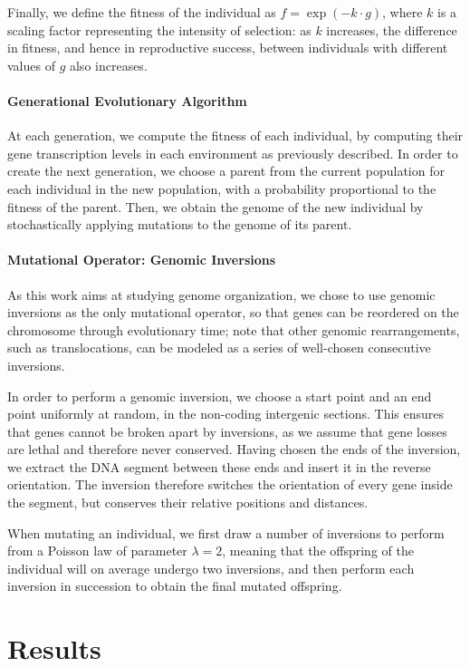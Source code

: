 Finally, we define the fitness of the individual as $f = \exp(-k \cdot g)$, where $k$ is a scaling factor representing the intensity of selection: as $k$ increases, the difference in fitness, and hence in reproductive success, between individuals with different values of $g$ also increases.

\paragraph{Generational Evolutionary Algorithm}
At each generation, we compute the fitness of each individual, by computing their gene transcription levels in each environment as previously described.
In order to create the next generation, we choose a parent from the current population for each individual in the new population, with a probability proportional to the fitness of the parent.
Then, we obtain the genome of the new individual by stochastically applying mutations to the genome of its parent.

\paragraph{Mutational Operator: Genomic Inversions}
As this work aims at studying genome organization, we chose to use genomic inversions as the only mutational operator, so that genes can be reordered on the chromosome through evolutionary time; note that other genomic rearrangements, such as translocations, can be modeled as a series of well-chosen consecutive inversions.

In order to perform a genomic inversion, we choose a start point and an end point uniformly at random, in the non-coding intergenic sections.
This ensures that genes cannot be broken apart by inversions, as we assume that gene losses are lethal and therefore never conserved.
Having chosen the ends of the inversion, we extract the DNA segment between these ends and insert it in the reverse orientation.
The inversion therefore switches the orientation of every gene inside the segment, but conserves their relative positions and distances.

When mutating an individual, we first draw a number of inversions to perform from a Poisson law of parameter $\lambda = 2$, meaning that the offspring of the individual will on average undergo two inversions, and then perform each inversion in succession to obtain the final mutated offspring.


\section{Results}

